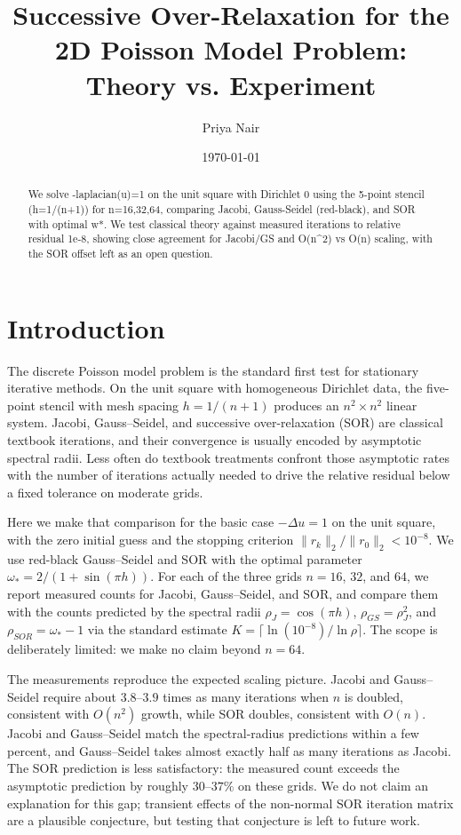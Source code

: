 \documentclass[11pt]{article}
\title{Successive Over-Relaxation for the 2D Poisson Model Problem: Theory vs. Experiment}
\author{Priya Nair}
\date{\today}
\begin{document}
\maketitle
\begin{abstract}
We solve -laplacian(u)=1 on the unit square with Dirichlet 0 using the 5-point stencil (h=1/(n+1)) for n=16,32,64, comparing Jacobi, Gauss-Seidel (red-black), and SOR with optimal w*. We test classical theory against measured iterations to relative residual 1e-8, showing close agreement for Jacobi/GS and O(n\textasciicircum{}2) vs O(n) scaling, with the SOR offset left as an open question.
\end{abstract}
\section{Introduction}
The discrete Poisson model problem is the standard first test for stationary iterative methods. On the unit square with homogeneous Dirichlet data, the five-point stencil with mesh spacing $h=1/(n+1)$ produces an $n^2 \times n^2$ linear system. Jacobi, Gauss--Seidel, and successive over-relaxation (SOR) are classical textbook iterations, and their convergence is usually encoded by asymptotic spectral radii. Less often do textbook treatments confront those asymptotic rates with the number of iterations actually needed to drive the relative residual below a fixed tolerance on moderate grids.

Here we make that comparison for the basic case $-\Delta u=1$ on the unit square, with the zero initial guess and the stopping criterion $\lVert r_k \rVert_2 / \lVert r_0 \rVert_2 < 10^{-8}$. We use red-black Gauss--Seidel and SOR with the optimal parameter $\omega_* = 2/(1+\sin(\pi h))$. For each of the three grids $n=16$, $32$, and $64$, we report measured counts for Jacobi, Gauss--Seidel, and SOR, and compare them with the counts predicted by the spectral radii $\rho_J = \cos(\pi h)$, $\rho_{GS} = \rho_J^2$, and $\rho_{SOR} = \omega_* - 1$ via the standard estimate $K = \lceil \ln(10^{-8}) / \ln \rho \rceil$. The scope is deliberately limited: we make no claim beyond $n=64$.

The measurements reproduce the expected scaling picture. Jacobi and Gauss--Seidel require about $3.8$--$3.9$ times as many iterations when $n$ is doubled, consistent with $O(n^2)$ growth, while SOR doubles, consistent with $O(n)$. Jacobi and Gauss--Seidel match the spectral-radius predictions within a few percent, and Gauss--Seidel takes almost exactly half as many iterations as Jacobi. The SOR prediction is less satisfactory: the measured count exceeds the asymptotic prediction by roughly $30$--$37\%$ on these grids. We do not claim an explanation for this gap; transient effects of the non-normal SOR iteration matrix are a plausible conjecture, but testing that conjecture is left to future work.
\end{document}
